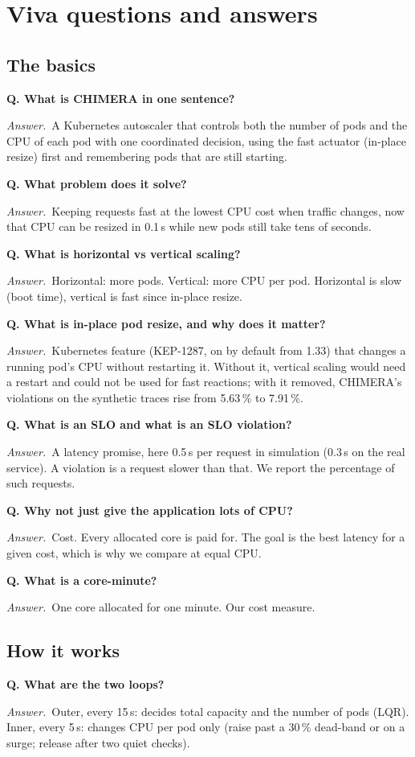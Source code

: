 \documentclass[11pt,a4paper]{article}
\newcommand{\Q}[1]{\par\medskip\textbf{Q. #1}\par}
\newcommand{\A}{\textit{Answer.}~}
\begin{document}
\section{Viva questions and answers}

\subsection*{The basics}
\Q{What is CHIMERA in one sentence?}
\A A Kubernetes autoscaler that controls both the number of pods and the CPU of each pod
with one coordinated decision, using the fast actuator (in-place resize) first and
remembering pods that are still starting.

\Q{What problem does it solve?}
\A Keeping requests fast at the lowest CPU cost when traffic changes, now that CPU can be
resized in 0.1\,s while new pods still take tens of seconds.

\Q{What is horizontal vs vertical scaling?}
\A Horizontal: more pods. Vertical: more CPU per pod. Horizontal is slow (boot time),
vertical is fast since in-place resize.

\Q{What is in-place pod resize, and why does it matter?}
\A Kubernetes feature (KEP-1287, on by default from 1.33) that changes a running pod's CPU
without restarting it. Without it, vertical scaling would need a restart and could not be
used for fast reactions; with it removed, CHIMERA's violations on the synthetic traces rise
from 5.63\,\% to 7.91\,\%.

\Q{What is an SLO and what is an SLO violation?}
\A A latency promise, here 0.5\,s per request in simulation (0.3\,s on the real service).
A violation is a request slower than that. We report the percentage of such requests.

\Q{Why not just give the application lots of CPU?}
\A Cost. Every allocated core is paid for. The goal is the best latency for a given cost,
which is why we compare at equal CPU.

\Q{What is a core-minute?}
\A One core allocated for one minute. Our cost measure.

\subsection*{How it works}
\Q{What are the two loops?}
\A Outer, every 15\,s: decides total capacity and the number of pods (LQR). Inner, every
5\,s: changes CPU per pod only (raise past a 30\,\% dead-band or on a surge; release after
two quiet checks).
\end{document}
